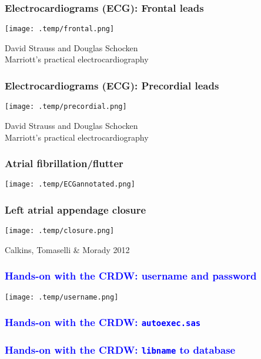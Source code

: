 \documentclass[11pt,pdftex,dvipsnames,usenames]{beamer}
\begin{document}
\begin{frame}\frametitle{Electrocardiograms (ECG): Frontal leads}
\begin{center}
\texttt{[image: .temp/frontal.png]}
\end{center}
David Strauss and Douglas Schocken\\ 
Marriott’s practical electrocardiography 
\end{frame}

\begin{frame}\frametitle{Electrocardiograms (ECG): Precordial leads}
\begin{center}
\texttt{[image: .temp/precordial.png]}
\end{center}
David Strauss and Douglas Schocken\\ 
Marriott’s practical electrocardiography
\end{frame}

\begin{frame}\frametitle{Atrial fibrillation/flutter}
\texttt{[image: .temp/ECGannotated.png]}
\end{frame}

\begin{frame}\frametitle{Left atrial appendage closure}
\begin{center}
\texttt{[image: .temp/closure.png]}
\end{center}
Calkins, Tomaselli \& Morady 2012
\end{frame}

\begin{frame}[fragile]
\frametitle{\bf\textcolor{blue}{Hands-on with the CRDW: username and password}}
\begin{center}
\texttt{[image: .temp/username.png]}
\end{center}
\end{frame}


\begin{frame}[fragile]
\frametitle{\bf\textcolor{blue}{Hands-on with the CRDW: \texttt{autoexec.sas}}}

\end{frame}

\begin{frame}[fragile]
\frametitle{\bf\textcolor{blue}{Hands-on with the CRDW: \texttt{libname} to database}}

\end{frame}
\end{document}

